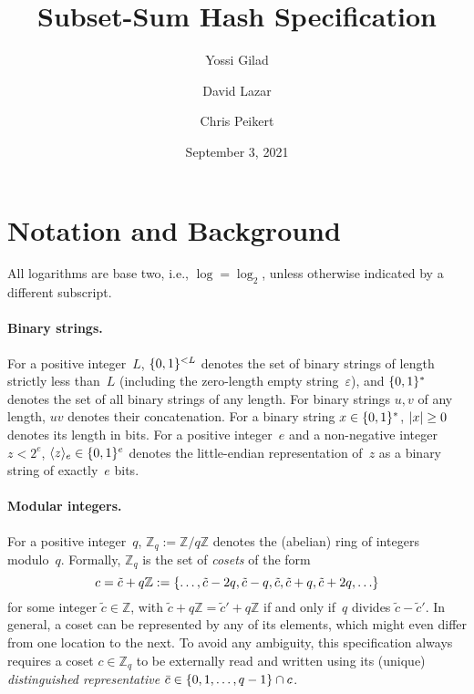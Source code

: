 \documentclass[11pt]{article}
\newcommand{\Z}{\ensuremath{\mathbb{Z}}}
\newcommand{\Zq}{\ensuremath{\Z_q}}
\DeclarePairedDelimiter\inner{\langle}{\rangle}
\DeclarePairedDelimiter\abs{\lvert}{\rvert}
\DeclarePairedDelimiter\set{\{}{\}}
\numberwithin{equation}{section}
\newcommand{\bit}{\ensuremath{\set{0,1}}}
\begin{document}
\title{Subset-Sum Hash Specification}

\date{September 3, 2021}

\author{Yossi Gilad}
\author{David Lazar}
\author{Chris Peikert}

\maketitle

\listoffixmes


\section{Notation and Background}
\label{sec:notation-background}

All logarithms are base two, i.e., $\log = \log_{2}$, unless otherwise
indicated by a different subscript.

\paragraph{Binary strings.}

For a positive integer~$L$, $\bit^{< L}$ denotes the set of binary
strings of length strictly less than~$L$ (including the zero-length
empty string~$\varepsilon$), and $\bit^{*}$ denotes the set of all
binary strings of any length. For binary strings $u,v$ of any length,
$u v$ denotes their concatenation. For a binary string
$x \in \bit^{*}$, $\abs{x} \geq 0$ denotes its length in bits. For a
positive integer~$e$ and a non-negative integer~$z < 2^{e}$,
$\inner{z}_{e} \in \bit^{e}$ denotes the little-endian representation
of~$z$ as a binary string of exactly~$e$ bits.

\paragraph{Modular integers.}

For a positive integer~$q$, $\Zq := \Z/q\Z$ denotes the (abelian) ring
of integers modulo~$q$. Formally, $\Zq$ is the set of \emph{cosets} of
the form
\[ c = \tilde{c} + q\Z := \set{\ldots, \tilde{c}-2q, \tilde{c}-q,
    \tilde{c}, \tilde{c}+q, \tilde{c}+2q, \ldots} \] for some integer
$\tilde{c} \in \Z$, with $\tilde{c} + q\Z = \tilde{c}' + q\Z$ if and
only if~$q$ divides $\tilde{c}-\tilde{c}'$. In general, a coset can be
represented by any of its elements, which might even differ from one
location to the next. To avoid any ambiguity, this specification
always requires a coset $c \in \Zq$ to be externally read and written
using its (unique) \emph{distinguished representative}
$\bar{c} \in \set{0, 1, \ldots, q-1} \cap c$.
\end{document}
